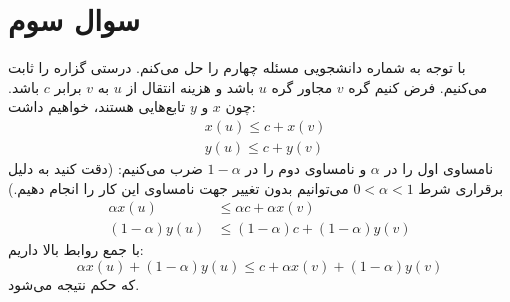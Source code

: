 \documentclass{article}
\begin{document}
		\section*{
		سوال سوم
	}
با توجه به شماره دانشجویی مسئله چهارم را حل می‌کنم. درستی گزاره را ثابت می‌کنیم. فرض کنیم گره $v$ مجاور گره $u$ باشد و هزینه انتقال از $u$ به $v$ برابر $c$ باشد. چون $x$ و $y$ تابع‌هایی 
هستند، خواهیم داشت:
\begin{align*}
	&x(u) \leq c + x(v) \\
	&y(u) \leq c + y(v)
\end{align*}
نامساوی اول را در $\alpha$ و نامساوی دوم را در 
$1 - \alpha$
ضرب می‌کنیم: (دقت کنید به دلیل برقراری شرط $0 < \alpha < 1$ می‌توانیم بدون تغییر جهت نامساوی این کار را انجام دهیم.)
\begin{align*}
	\alpha x(u) &\leq \alpha c + \alpha x(v) \\
	(1- \alpha)y(u) &\leq (1- \alpha) c + (1- \alpha) y(v)
\end{align*}
با جمع روابط بالا داریم:
$$\alpha x(u) + (1- \alpha)y(u) \leq c + \alpha x(v) + (1- \alpha) y(v)$$
که حکم نتیجه می‌شود.
\end{document}
